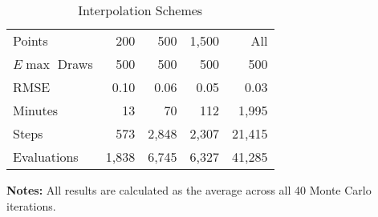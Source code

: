 \begin{table}\onehalfspacing
\begin{center}
\begin{threeparttable}
  \captionsetup{width=30cm}
  \caption{Interpolation Schemes}
  \label{Interpolation Schemes}
  \begin{tabular}{lrrrr}\toprule
  Points      & 200 & 500 & 1,500  & All \\
  $E\max$ Draws & 500 &  500 &   500 & 500 \\
  \midrule
  RMSE        & 0.10 &   0.06 &    0.05 &  0.03  \\
  Minutes     &  13 &      70 &    112 &   1,995 \\
  Steps       &  573 &   2,848 &    2,307 &  21,415 \\
  Evaluations & 1,838 &   6,745 &    6,327 &  41,285 \\
  \bottomrule
  \end{tabular}\scriptsize
  \begin{tablenotes}\item \textbf{Notes:} All results are calculated as the average across all 40 Monte Carlo iterations.
  \end{tablenotes}
  \end{threeparttable}
  \end{center}
\end{table}
